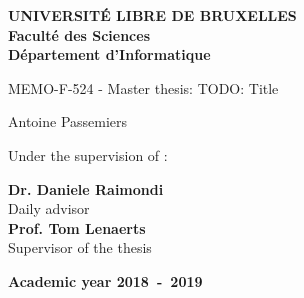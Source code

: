 \documentclass[11pt,a4paper,oneside]{book}
\begin{document}
\frontmatter
\begin{titlepage}
\begin{center}
\textbf{UNIVERSIT\'E LIBRE DE BRUXELLES}\\
\textbf{Facult\'{e} des Sciences}\\
\textbf{D\'{e}partement d'Informatique}
\vfill{}\vfill{}

{\LARGE  MEMO-F-524 - Master thesis:
 \vspace*{2cm}
 \linebreak[4] TODO: Title}

{\Huge \par}
\begin{center}{\Large Antoine Passemiers}\end{center}{\Huge \par}
\vfill{}\vfill{}
\large Under the supervision of : \\
\begin{flushleft}
\vspace{0.2cm}
\textbf{Dr. Daniele Raimondi} \\
\large Daily advisor \\
\vspace{0.5cm}
\textbf{Prof. Tom Lenaerts} \\
\large Supervisor of the thesis \\
{\large }\hfill{}{}
\end{flushleft}
{\large\par}\vfill{}\vfill{}\enlargethispage{3cm}
\textbf{Academic year 2018~-~2019}
\end{center}
\end{titlepage}


\thispagestyle{empty} 
\null

\makeatletter
\def\BState{\State\hskip-\ALG@thistlm}
\makeatother

\newenvironment{vcenterpage}
{\newpage\thispagestyle{empty} 
\vspace*{\fill}}
{\vspace*{\fill}\par\pagebreak}

\newcommand{\pdbid}[1] {(PDB: #1)}
\newcommand{\abs}[1]{\left|#1\right|}

\thispagestyle{empty} 
\setcounter{page}{0}
\tableofcontents
\mainmatter 














\appendix

\backmatter

\printindex %





\newpage
\printglossary[type=main]
\end{document}
